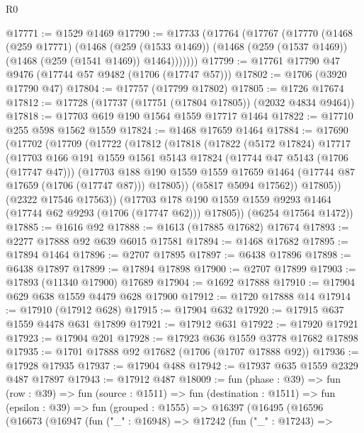 \begin{lexlean}{R0}
\begin{coremodule}
@17771 := @1529 @1469
@17790 := @17733
    (@17764
      (@17767
        (@17770
          (@1468
            (@259 @17771)
            (@1468
              (@259 (@1533 @1469))
              (@1468 (@259 (@1537 @1469)) (@1468 (@259 (@1541 @1469)) @1464)))))))
@17799 := @17761 @17790 @47 @9476 (@17744 @57 @9482 (@1706 (@17747 @57)))
@17802 := @1706 (@3920 @17790 @47)
@17804 := @17757 (@17799 @17802)
@17805 := @1726 @17674
@17812 := @17728 (@17737 (@17751 (@17804 @17805)) (@2032 @4834 @9464))
@17818 := @17703 @619 @190 @1564 @1559 @17717 @1464
@17822 := @17710 @255 @598 @1562 @1559
@17824 := @1468 @17659 @1464
@17884 := @17690
    (@17702
      (@17709
        (@17722
          (@17812
            (@17818
              (@17822
                (@5172 @17824)
                @17717
                (@17703
                  @166
                  @191
                  @1559
                  @1561
                  @5143
                  @17824
                  (@17744 @47 @5143 (@1706 (@17747 @47)))
                  (@17703
                    @188
                    @190
                    @1559
                    @1559
                    @17659
                    @1464
                    (@17744 @87 @17659 (@1706 (@17747 @87)))
                    @17805))
                (@5817 @5094 @17562))
              @17805))
          (@2322 @17546 @17563))
        (@17703 @178 @190 @1559 @1559 @9293 @1464 (@17744 @62 @9293 (@1706 (@17747 @62))) @17805))
      (@6254 @17564 @1472))
@17885 := @1616 @92
@17888 := @1613 (@17885 @17682) @17674
@17893 := @2277 @17888 @92 @639 @6015 @17581
@17894 := @1468 @17682
@17895 := @17894 @1464
@17896 := @2707 @17895
@17897 := @6438 @17896
@17898 := @6438 @17897
@17899 := @17894 @17898
@17900 := @2707 @17899
@17903 := @17893 (@11340 @17900) @17689
@17904 := @1692 @17888
@17910 := @17904 @629 @638 @1559 @4479 @628 @17900
@17912 := @1720 @17888 @14
@17914 := @17910 (@17912 @628)
@17915 := @17904 @632
@17920 := @17915 @637 @1559 @4478 @631 @17899
@17921 := @17912 @631
@17922 := @17920 @17921
@17923 := @17904 @201
@17928 := @17923 @636 @1559 @3778 @17682 @17898
@17935 := @1701 @17888 @92 @17682 (@1706 (@1707 @17888 @92))
@17936 := @17928 @17935
@17937 := @17904 @488
@17942 := @17937 @635 @1559 @2329 @487 @17897
@17943 := @17912 @487
@18009 := fun (phase : @39) =>
  fun (row : @39) =>
  fun (source : @1511) =>
  fun (destination : @1511) =>
  fun (epsilon : @39) =>
  fun (grouped : @1555) =>
  @16397
    (@16495
      (@16596
        (@16673
          (@16947
            (fun ("_" : @16948) =>
            @17242
              (fun ("_" : @17243) =>

\end{coremodule}
\end{lexlean}
